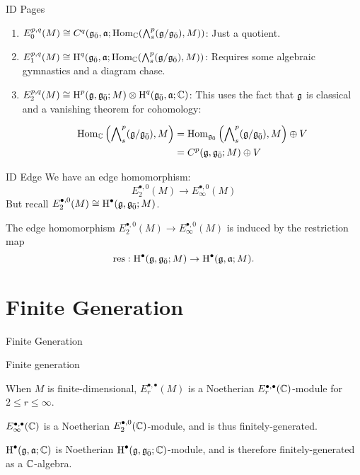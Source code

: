 \documentclass{beamer}
\newcommand{\sectionframe}[1]{\begin{frame}\begin{center}{\Huge #1 }\end{center}\end{frame}}
\begin{document}
\begin{frame}{ID Pages}\pause
  \begin{enumerate}
  \pause\item $E_0^{p,q}(M) \cong C^q({\mathfrak{g}}_{\bar{0}},\mathfrak{a};\operatorname{Hom}_{\mathbb{C}}(\bigwedge\nolimits^{p}_s(\mathfrak{g}/{\mathfrak{g}}_{\bar{0}}),M))$: Just a quotient.
    \vspace{0.2in}
  \pause\item $E_1^{p,q}(M) \cong \operatorname{H}^q({\mathfrak{g}}_{\bar{0}},\mathfrak{a};\operatorname{Hom}_{\mathbb{C}}(\bigwedge\nolimits^{p}_s(\mathfrak{g}/{\mathfrak{g}}_{\bar{0}}),M))$: Requires some algebraic gymnastics and a diagram chase.
    \vspace{0.2in}
  \pause\item $E_2^{p,q}(M) \cong \operatorname{H}^p(\mathfrak{g},{\mathfrak{g}}_{\bar{0}};M) \otimes \operatorname{H}^q({\mathfrak{g}}_{\bar{0}},\mathfrak{a};\mathbb{C})$: This uses the fact that $\mathfrak{g}$ is classical and a vanishing theorem for cohomology:
    
  \begin{align*}
    \operatorname{Hom}_{\mathbb{C}}\left(\bigwedge\nolimits^{p}_s(\mathfrak{g}/{\mathfrak{g}}_{\bar{0}}),M\right) &= \operatorname{Hom}_{{\mathfrak{g}}_{\bar{0}}}\left(\bigwedge\nolimits^{p}_s(\mathfrak{g}/{\mathfrak{g}}_{\bar{0}}),M\right) \oplus V  \\ &= C^p(\mathfrak{g},{\mathfrak{g}}_{\bar{0}};M) \oplus V
  \end{align*}
\end{enumerate}
\end{frame}

\begin{frame}{ID Edge}
  \pause
  We have an edge homomorphism:
  \[
    {E_2^{\bullet,0}(M)} \to E_\infty^{\bullet,0}(M)
  \]\pause
  But recall $E_2^{\bullet,0}(M) \cong \operatorname{H}^\bullet(\mathfrak{g},{\mathfrak{g}}_{\bar{0}};M)$.
\pause
  \begin{theorem}
    The edge homomorphism $E_2^{\bullet,0}(M) \to E_\infty^{\bullet,0}(M)$ is induced by the restriction map
    \[
      \operatorname{res}:\operatorname{H}^\bullet(\mathfrak{g},{\mathfrak{g}}_{\bar{0}};M) \to \operatorname{H}^\bullet(\mathfrak{g},\mathfrak{a};M).
    \]
    
  \end{theorem}
\end{frame}


\section{Finite Generation}

\sectionframe{Finite Generation}

\begin{frame}{Finite generation}
  \pause
  \begin{theorem}
    When $M$ is finite-dimensional, $E_r^{\bullet,\bullet}(M)$ is a Noetherian $E_r^{\bullet,\bullet}(\mathbb{C})$-module for $2 \leq r \leq \infty$.
  \end{theorem}
  \pause
  \begin{corollary}
    $E_\infty^{\bullet,\bullet}(\mathbb{C})$ is a Noetherian $E_2^{\bullet,0}(\mathbb{C})$-module, and is thus finitely-generated.
  \end{corollary}
  \pause
  \begin{corollary}
    $\operatorname{H}^\bullet(\mathfrak{g},\mathfrak{a};\mathbb{C})$ is Noetherian $\operatorname{H}^\bullet(\mathfrak{g},{\mathfrak{g}}_{\bar{0}};\mathbb{C})$-module, and is therefore finitely-generated as a $\mathbb{C}$-algebra.
  \end{corollary}
\end{frame}
\end{document}

